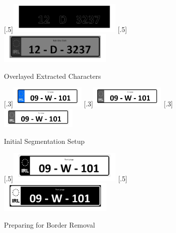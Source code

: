 \documentclass[a4paper]{article}
\begin{document}
	\begin{figure}[H]
		\centering
		[.5\linewidth]{\includegraphics[height=1.5cm]{Results/Q2/NumPlate2/qanumber_plate_2Canny.jpg}}%
		[.5\linewidth]{\includegraphics[height=1.5cm]{Results/Q2/NumPlate2/qanumber_plate_2Overlay.jpg}}%
		\caption{Overlayed Extracted Characters}
		\label{fig:}
	\end{figure}
	\begin{figure}[H]
		\centering
		[.3\linewidth]{\includegraphics[height=1cm]{Results/Q2/NumPlate3/qanumber_plate_3.jpg}}%
		[.3\linewidth]{\includegraphics[height=1cm]{Results/Q2/NumPlate3/qanumber_plate_3Grey.jpg}}%
		[.3\linewidth]{\includegraphics[height=1cm]{Results/Q2/NumPlate3/qanumber_plate_3Low.jpg}}%
		\caption{Initial Segmentation Setup}
		\label{fig:}
	\end{figure}
	\begin{figure}[H]
		\centering
		[.5\linewidth]{\includegraphics[height=1.5cm]{Results/Q2/NumPlate3/qanumber_plate_3Mid.jpg}}%
		[.5\linewidth]{\includegraphics[height=1.5cm]{Results/Q2/NumPlate3/qanumber_plate_3Not.jpg}}%
		\caption{Preparing for Border Removal}
		\label{fig:}
	\end{figure}
\end{document}
